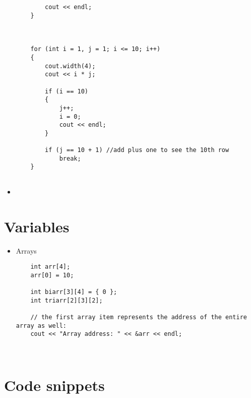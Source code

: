\documentclass{article}
\begin{document}
\begin{itemize}
\begin{lstlisting}
		cout << endl;
	}

	

	for (int i = 1, j = 1; i <= 10; i++)
	{
		cout.width(4);
		cout << i * j;

		if (i == 10)
		{
			j++;
			i = 0;
			cout << endl;
		}

		if (j == 10 + 1) //add plus one to see the 10th row
			break;
	}


\end{lstlisting}




\item{}

\begin{lstlisting}

\end{lstlisting}

\end{itemize}






\section{Variables}

\begin{itemize}

\item{Arrays}
\begin{lstlisting}
	int arr[4];
	arr[0] = 10;

	int biarr[3][4] = { 0 };
	int triarr[2][3][2];

	// the first array item represents the address of the entire array as well:
	cout << "Array address: " << &arr << endl;
	
	
\end{lstlisting}

\end{itemize}







\section{Code snippets}
\end{document}
